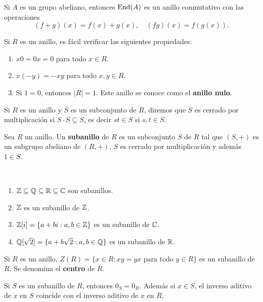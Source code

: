 \begin{exercise}
Si $A$ es un grupo abeliano, entonces $\operatorname{End}(A)$ es un anillo conmutativo con 
las operaciones
\[
(f+g)(x)=f(x)+g(x),\quad
(fg)(x)=f(g(x)).
\]	
\end{exercise}

Si $R$ es un anillo, es fácil verificar las siguientes propiedades:
\begin{enumerate}
	\item $x0=0x=0$ para todo $x\in R$.
	\item $x(-y)=-xy$ para todo $x,y\in R$.
	\item Si $1=0$, entonces $|R|=1$. Este anillo se conoce como el \textbf{anillo nulo}.
\end{enumerate}

Si $R$ es un anillo y $S$ es un subconjunto de $R$, diremos que 
$S$ es cerrado por multiplicación si $S\cdot S\subseteq S$, 
es decir $st\in S$ si $s,t\in S$. 

\begin{definition}
Sea $R$ un anillo. 
Un \textbf{subanillo} de $R$ es un subconjunto $S$ de $R$ tal que $(S,+)$ es un subgrupo abeliano de $(R,+)$, $S$ es cerrado por multiplicación y además $1\in S$. 
\end{definition}

\begin{examples}\
\begin{enumerate}
\item $\mathbb{Z}\subseteq \mathbb{Q}\subseteq\mathbb{R}\subseteq\mathbb{C}$ son subanillos. 
\item $\mathbb{Z}$ es un subanillo de $\mathbb{Z}$.
\item $\mathbb{Z}[i]=\{a+bi:a,b\in\mathbb{Z}\}$ es un subanillo de $\mathbb{C}$. 
\item $\mathbb{Q}[\sqrt{2}]=\{a+b\sqrt{2}:a,b\in\mathbb{Q}\}$ es un subanillo de $\mathbb{R}$.
\end{enumerate}
\end{examples}

\begin{example}
Si $R$ es un anillo, $Z(R)=\{x\in R:xy=yx\text{ para todo $y\in R$}\}$ es un subanillo de $R$. Se denomina el \textbf{centro} de $R$.
\end{example}

\begin{exercise}
Si $S$ es un subanillo de $R$, entonces $0_S=0_R$. 
Además si $x\in S$, el inverso aditivo de $x$ en $S$ coincide con el inverso aditivo de $x$ en $R$.	
\end{exercise}

